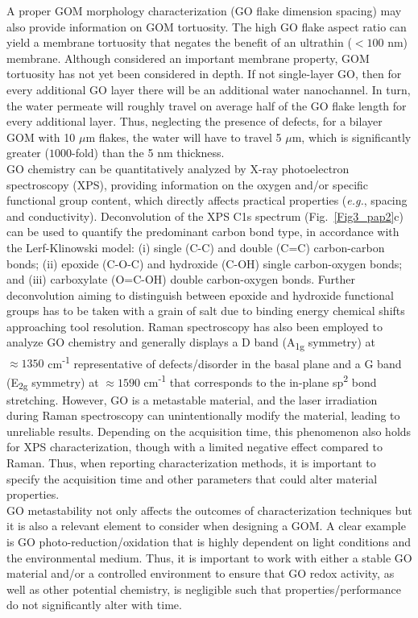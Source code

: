 A proper GOM morphology characterization (GO flake dimension spacing) may also provide information on GOM tortuosity. The high GO flake aspect ratio can yield a membrane tortuosity that negates the benefit of an ultrathin ($<100$ nm) membrane. Although considered an important membrane property, GOM tortuosity has not yet been considered in depth. If not single-layer GO, then for every additional GO layer there will be an additional water nanochannel. In turn, the water permeate will roughly travel on average half of the GO flake length for every additional layer. Thus, neglecting the presence of defects, for a bilayer GOM with 10 $\mu$m flakes, the water will have to travel 5 $\mu$m, which is significantly greater ($1000$-fold) than the 5 nm thickness.\\
GO chemistry can be quantitatively analyzed by X-ray photoelectron spectroscopy (XPS), providing information on the oxygen and/or specific functional group content, which directly affects practical properties (\textit{e.g.}, spacing and conductivity).\cite{mattevi2009evolution} Deconvolution of the XPS C1s spectrum (Fig.~\ref{Fig3_pap2}c) can be used to quantify the predominant carbon bond type, in accordance with the Lerf-Klinowski model:\cite{lerf1998structure} (i) single (C-C) and double (C=C) carbon-carbon bonds; (ii) epoxide (C-O-C) and hydroxide (C-OH) single carbon-oxygen bonds; and (iii) carboxylate (O=C-OH) double carbon-oxygen bonds. Further deconvolution aiming to distinguish between epoxide and hydroxide functional groups has to be taken with a grain of salt due to binding energy chemical shifts approaching tool resolution.\cite{wepasnick2011surface}
Raman spectroscopy has also been employed to analyze GO chemistry and generally displays a D band (A\textsubscript{1g} symmetry) at $\approx1350$ cm\textsuperscript{-1} representative of defects/disorder in the basal plane and a G band (E\textsubscript{2g} symmetry) at $\approx1590$ cm\textsuperscript{-1} that corresponds to the in-plane sp\textsuperscript{2} bond stretching.\cite{amadei2014time} However, GO is a metastable material, and the laser irradiation during Raman spectroscopy can unintentionally modify the material, leading to unreliable results.\cite{rogala2016observer} Depending on the acquisition time, this phenomenon also holds for XPS characterization, though with a limited negative effect compared to Raman. Thus, when reporting characterization methods, it is important to specify the acquisition time and other parameters that could alter material properties.\\
GO metastability not only affects the outcomes of characterization techniques but it is also a relevant element to consider when designing a GOM. A clear example is GO photo-reduction/oxidation that is highly dependent on light conditions and the environmental medium.\cite{hou2015photochemical} Thus, it is important to work with either a stable GO material and/or a controlled environment to ensure that GO redox activity, as well as other potential chemistry, is negligible such that properties/performance do not significantly alter with time.\cite{yeh2015origin}

